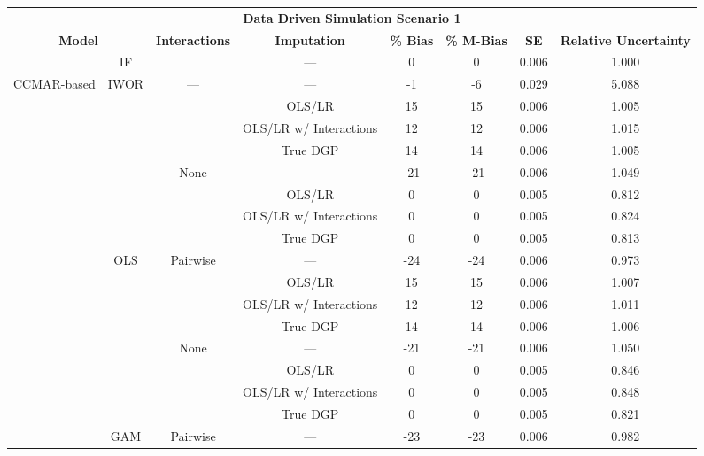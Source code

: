 \begin{table}
\centering
\begin{tabular}[ht]{|>{}c|c|c|c|c|c|c|>{}c|}
\hline
\multicolumn{8}{|c|}{\textbf{Data Driven Simulation Scenario 1}} \\
\cline{1-8}
\multicolumn{2}{|c|}{\textbf{Model}} & \textbf{Interactions} & \textbf{Imputation} & \textbf{\% Bias} & \textbf{\% M-Bias} & \textbf{SE} & \textbf{Relative Uncertainty}\\
\hline
 & IF &  & --- & 0 & 0 & 0.006 & 1.000\\
\cline{2-2}
\cline{4-8}
\multirow{-2}{*}{\centering\arraybackslash CCMAR-based} & IWOR & \multirow{-2}{*}{\centering\arraybackslash ---} & --- & -1 & -6 & 0.029 & 5.088\\
\cline{1-8}
 &  &  & OLS/LR & 15 & 15 & 0.006 & 1.005\\
\cline{4-8}
 &  &  & OLS/LR w/ Interactions & 12 & 12 & 0.006 & 1.015\\
\cline{4-8}
 &  &  & True DGP & 14 & 14 & 0.006 & 1.005\\
\cline{4-8}
 &  & \multirow{-4}{*}{\centering\arraybackslash None} & --- & -21 & -21 & 0.006 & 1.049\\
\cline{3-8}
 &  &  & OLS/LR & 0 & 0 & 0.005 & 0.812\\
\cline{4-8}
 &  &  & OLS/LR w/ Interactions & 0 & 0 & 0.005 & 0.824\\
\cline{4-8}
 &  &  & True DGP & 0 & 0 & 0.005 & 0.813\\
\cline{4-8}
 & \multirow{-8}{*}{\centering\arraybackslash OLS} & \multirow{-4}{*}{\centering\arraybackslash Pairwise} & --- & -24 & -24 & 0.006 & 0.973\\
\cline{2-8}
 &  &  & OLS/LR & 15 & 15 & 0.006 & 1.007\\
\cline{4-8}
 &  &  & OLS/LR w/ Interactions & 12 & 12 & 0.006 & 1.011\\
\cline{4-8}
 &  &  & True DGP & 14 & 14 & 0.006 & 1.006\\
\cline{4-8}
 &  & \multirow{-4}{*}{\centering\arraybackslash None} & --- & -21 & -21 & 0.006 & 1.050\\
\cline{3-8}
 &  &  & OLS/LR & 0 & 0 & 0.005 & 0.846\\
\cline{4-8}
 &  &  & OLS/LR w/ Interactions & 0 & 0 & 0.005 & 0.848\\
\cline{4-8}
 &  &  & True DGP & 0 & 0 & 0.005 & 0.821\\
\cline{4-8}
 & \multirow{-8}{*}{\centering\arraybackslash GAM} & \multirow{-4}{*}{\centering\arraybackslash Pairwise} & --- & -23 & -23 & 0.006 & 0.982\\

\end{tabular}
\end{table}
